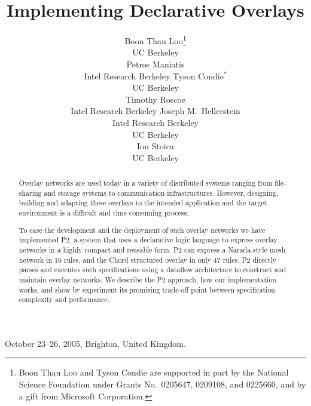\documentclass{sig-alt-full}
\def\Sys{P2\xspace}
\def\PChordLines{47\xspace}
\def\PNaradaLines{16\xspace}
\begin{document}
 {October 23--26, 2005, Brighton, United Kingdom.}


\title{Implementing Declarative Overlays}


\author{
\alignauthor
Boon Thau Loo\thanks{Boon Thau Loo and Tyson Condie are supported in
  part by the National Science Foundation under Grants No.\ 0205647,
  0209108, and 0225660, and by a gift from Microsoft Corporation.}\\
{\affaddr UC Berkeley}\\
\vspace{24pt}
Petros Maniatis\\
{\affaddr Intel Research Berkeley}
\alignauthor
Tyson Condie$^*$\\
{\affaddr UC Berkeley}\\
\vspace{24pt}
Timothy Roscoe\\
{\affaddr Intel Research Berkeley}
\alignauthor
Joseph M.\ Hellerstein\\
{\affaddr Intel Research Berkeley}\\
{\affaddr UC Berkeley}\\
\vspace{13.5pt}
Ion Stoica\\
{\affaddr UC Berkeley}
}
\date{}
\maketitle

\begin{abstract}
Overlay networks are used today in a variety of distributed systems
ranging from file-sharing and storage systems to communication
infrastructures.  However, designing, building and adapting these
overlays to the intended application and the target environment is a
difficult and time consuming process.

To ease the development and the deployment of such overlay networks
we have implemented \Sys, a system that uses a declarative logic
language to express overlay networks in a highly compact and
reusable form. \Sys can express a Narada-style mesh network in
\PNaradaLines rules, and the Chord structured overlay in only
\PChordLines rules.  \Sys directly parses and executes such
specifications using a dataflow architecture to construct and maintain
overlay networks.  We describe the \Sys approach, how our
implementation works, and show by experiment its promising trade-off point
between specification complexity and performance.

\end{abstract}
\end{document}
